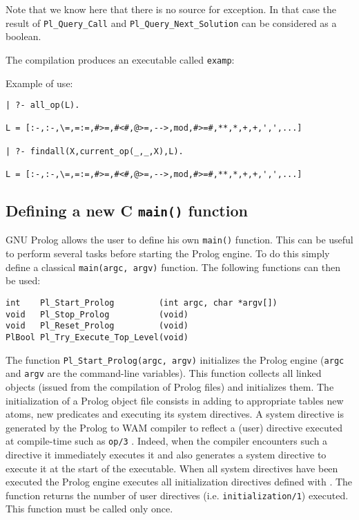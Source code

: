 Note that we know here that there is no source for exception. In that case
the result of \texttt{Pl\_Query\_Call} and \texttt{Pl\_Query\_Next\_Solution}
can be considered as a boolean.

The compilation produces an executable called \texttt{examp}:


Example of use:

\begin{Indentation}
\begin{verbatim}
| ?- all_op(L).

L = [:-,:-,\=,=:=,#>=,#<#,@>=,-->,mod,#>=#,**,*,+,+,',',...]

| ?- findall(X,current_op(_,_,X),L).

L = [:-,:-,\=,=:=,#>=,#<#,@>=,-->,mod,#>=#,**,*,+,+,',',...]
\end{verbatim}
\end{Indentation}


\subsection{Defining a new C \texttt{main()} function}

GNU Prolog allows the user to define his own \texttt{main()}
function. This can be useful to perform several tasks before starting
the Prolog engine. To do this simply define a classical
\texttt{main(argc, argv)} function. The following functions can then be used:

\begin{Indentation}
\begin{verbatim}
int    Pl_Start_Prolog         (int argc, char *argv[])
void   Pl_Stop_Prolog          (void)
void   Pl_Reset_Prolog         (void)
PlBool Pl_Try_Execute_Top_Level(void)
\end{verbatim}
\end{Indentation}

The function \texttt{Pl\_Start\_Prolog(argc, argv)} initializes the Prolog
engine (\texttt{argc} and \texttt{argv} are the command-line variables). This
function collects all linked objects (issued from the compilation of Prolog
files) and initializes them. The initialization of a Prolog object file
consists in adding to appropriate tables new atoms, new predicates and
executing its system directives. A system directive is generated by the
Prolog to WAM compiler to reflect a (user) directive executed at compile-time
such as \texttt{op/3} . Indeed, when the compiler encounters such
a directive it immediately executes it and also generates a system directive
to execute it at the start of the executable.  When all system directives
have been executed the Prolog engine executes all initialization directives
defined with 
. The function returns the number of user
directives (i.e. \texttt{initialization/1}) executed. This function must be
called only once.

